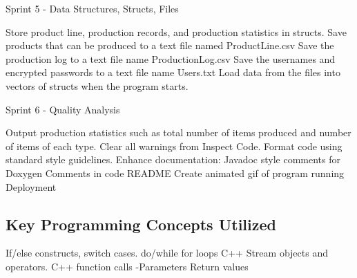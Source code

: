 Sprint 5 -\/ Data Structures, Structs, Files \begin{DoxyVerb}Store product line, production records, and production statistics in structs.
Save products that can be produced to a text file named ProductLine.csv 
Save the production log to a text file name ProductionLog.csv 
Save the usernames and encrypted passwords to a text file name Users.txt
Load data from the files into vectors of structs when the program starts.
\end{DoxyVerb}


Sprint 6 -\/ Quality Analysis \begin{DoxyVerb}Output production statistics such as total number of items produced and number of items of each type. 
Clear all warnings from Inspect Code.
Format code using standard style guidelines.
Enhance documentation:
    Javadoc style comments for Doxygen
    Comments in code
    README
        Create animated gif of program running
Deployment
\end{DoxyVerb}


\subsection*{Key Programming Concepts Utilized}

If/else constructs, switch cases. do/while for loops C++ Stream objects and operators. C++ function calls -\/\+Parameters Return values 